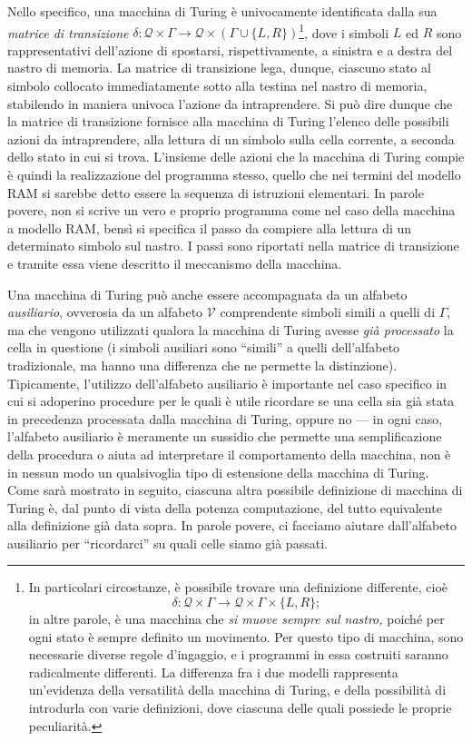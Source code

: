 \documentclass[10pt]{\classname}
\theoremstyle{definition}
\theoremstyle{definition}
\begin{document}
Nello specifico, una macchina di Turing è univocamente identificata dalla sua
\emph{matrice di transizione} $\delta  : \mathcal Q \times \Gamma \rightarrow
\mathcal Q \times (\Gamma \cup \{L,R\})$\footnote{In particolari circostanze, è
possibile trovare una definizione differente, cioè $$\delta  : \mathcal Q \times
\Gamma \rightarrow \mathcal Q \times \Gamma \times \{L,R\};$$ in altre parole, è
una macchina che \emph{si muove sempre sul nastro,} poiché per ogni stato è
sempre definito un movimento. Per questo tipo di macchina, sono necessarie
diverse regole d'ingaggio, e i programmi in essa costruiti saranno radicalmente
differenti. La differenza fra i due modelli rappresenta un'evidenza della
versatilità della macchina di Turing, e della possibilità di introdurla con
varie definizioni, dove ciascuna delle quali possiede le proprie peculiarità.},
dove i simboli $L$ ed $R$ sono rappresentativi dell'azione di spostarsi,
rispettivamente, a sinistra e a destra del nastro di memoria. La matrice di
transizione lega, dunque, ciascuno stato al simbolo collocato immediatamente
sotto alla testina nel nastro di memoria, stabilendo in maniera univoca
l'azione da intraprendere. Si può dire dunque che la matrice di transizione
fornisce alla macchina di Turing l'elenco delle possibili azioni da
intraprendere, alla lettura di un simbolo sulla cella corrente, a seconda dello
stato in cui si trova. L'insieme delle azioni che la macchina di Turing compie
è quindi la realizzazione del programma stesso, quello che nei termini del
modello RAM si sarebbe detto essere la sequenza di istruzioni elementari. In
parole povere, non si scrive un vero e proprio programma come nel caso della
macchina a modello RAM, bensì si specifica il passo da compiere alla lettura di
un determinato simbolo sul nastro. I passi sono riportati nella matrice di
transizione e tramite essa viene descritto il meccanismo della macchina.

Una macchina di Turing può anche essere accompagnata da un alfabeto
\emph{ausiliario}, ovverosia da un alfabeto $\mathcal V$ comprendente simboli
simili a quelli di $\Gamma$, ma che vengono utilizzati qualora la macchina di
Turing avesse \emph{già processato} la cella in questione (i simboli ausiliari
sono ``simili'' a quelli dell'alfabeto tradizionale, ma hanno una differenza
che ne permette la distinzione). Tipicamente, l'utilizzo dell'alfabeto
ausiliario è importante nel caso specifico in cui si adoperino procedure per le
quali è utile ricordare se una cella sia già stata in precedenza processata
dalla macchina di Turing, oppure no --- in ogni caso, l'alfabeto ausiliario è
meramente un sussidio che permette una semplificazione della procedura o aiuta
ad interpretare il comportamento della macchina, non è in nessun modo un
qualsivoglia tipo di estensione della macchina di Turing. Come sarà mostrato in
seguito, ciascuna altra possibile definizione di macchina di Turing è, dal
punto di vista della potenza computazione, del tutto equivalente alla
definizione già data sopra. In parole povere, ci facciamo aiutare dall'alfabeto
ausiliario per ``ricordarci'' su quali celle siamo già passati.
\end{document}
